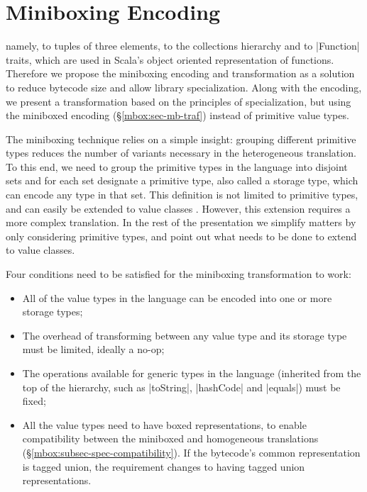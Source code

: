 \newpage
\section{Miniboxing Encoding}
\label{mbox:sec-miniboxing}

 namely, to tuples of three elements, to the collections hierarchy and to |Function| traits, which are used in Scala's object oriented representation of functions. Therefore we propose the miniboxing encoding and transformation as a solution to reduce bytecode size and allow library specialization. Along with the encoding, we present a transformation based on the principles of specialization, but using the miniboxed encoding (\S\ref{mbox:sec-mb-traf}) instead of primitive value types.

The miniboxing technique relies on a simple insight: grouping different primitive types reduces the number of variants necessary in the heterogeneous translation. To this end, we need to group the primitive types in the language into disjoint sets and for each set designate a primitive type, also called a storage type, which can encode any type in that set. This definition is not limited to primitive types, and can easily be extended to value classes \cite{rose-value-classes-vm,rose-value-classes-tearing}. However, this extension requires a more complex translation. In the rest of the presentation we simplify matters by only considering primitive types, and point out what needs to be done to extend to value classes.

Four conditions need to be satisfied for the miniboxing transformation to work:
\begin{itemize}
  \item All of the value types in the language can be encoded into one or more storage types;
  \item The overhead of transforming between any value type and its storage type must be limited, ideally a no-op;
  \item The operations available for generic types in the language (inherited from the top of the hierarchy, such as |toString|, |hashCode| and |equals|) must be fixed;
  \item All the value types need to have boxed representations, to enable compatibility between the miniboxed and homogeneous translations (\S\ref{mbox:subsec-spec-compatibility}). If the bytecode's common representation is tagged union, the requirement changes to having tagged union representations.
\end{itemize}

